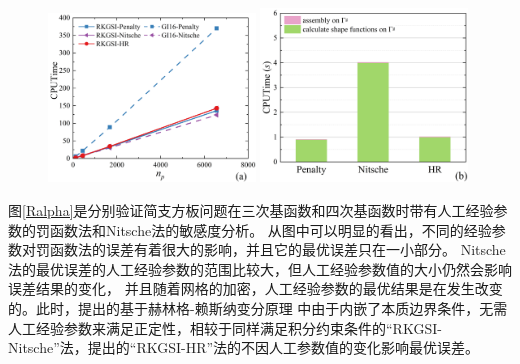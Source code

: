 \begin{figure}[H]
    \centering
    \begin{subcaptiongroup}
    \includegraphics[width=0.49\textwidth]{figure/PHR/R/Qcputime.png}
    \label{Qcputime}
    \includegraphics[width=0.49\textwidth]{figure/PHR/R/Qefficiency.png}
    \label{Qefficiency}
    \end{subcaptiongroup}
\caption{}
\label{RQcputime}
\end{figure}
图\ref{Ralpha}是分别验证简支方板问题在三次基函数和四次基函数时带有人工经验参数的罚函数法和Nitsche法的敏感度分析。
从图中可以明显的看出，不同的经验参数对罚函数法的误差有着很大的影响，并且它的最优误差只在一小部分。
Nitsche法的最优误差的人工经验参数的范围比较大，但人工经验参数值的大小仍然会影响误差结果的变化，
并且随着网格的加密，人工经验参数的最优结果是在发生改变的。此时，提出的基于赫林格-赖斯纳变分原理
中由于内嵌了本质边界条件，无需人工经验参数来满足正定性，相较于同样满足积分约束条件的“RKGSI-Nitsche”法，提出的“RKGSI-HR”法的不因人工参数值的变化影响最优误差。
